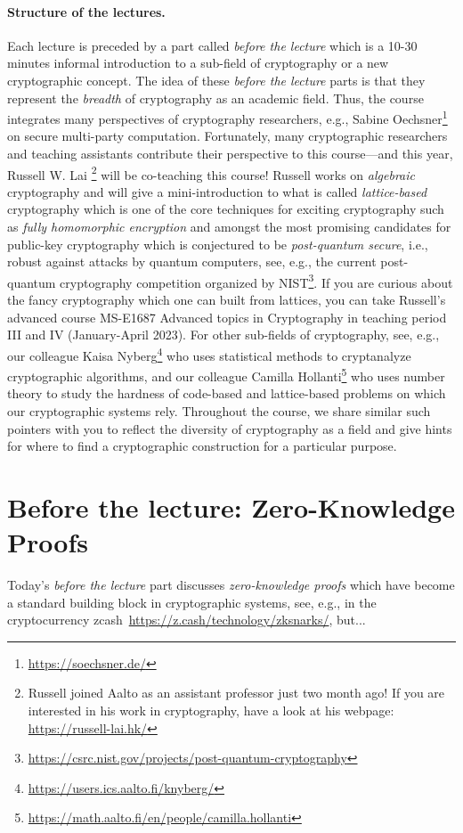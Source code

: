 \documentclass[a4paper,table,dvipsnames]{article}
\theoremstyle{definition}
\begin{document}
\paragraph{Structure of the lectures.} Each lecture is preceded by a part called \emph{before the lecture} which is a 10-30 minutes
informal introduction to a sub-field of cryptography or a new cryptographic concept. The idea
of these \emph{before the lecture} parts is that they represent the \emph{breadth} of cryptography as
an academic field. Thus, the course integrates many perspectives of cryptography researchers, e.g.,
Sabine Oechsner\footnote{\url{https://soechsner.de/}} on secure multi-party computation. Fortunately, 
many cryptographic researchers and teaching assistants contribute
their perspective to this course---and this year, Russell W. Lai \footnote{Russell joined Aalto as an
assistant professor just two month ago! If you are interested in his work in cryptography, have a look at his 
webpage: \url{https://russell-lai.hk/}}
will be co-teaching this course! Russell works on \emph{algebraic} cryptography and will give a mini-introduction to
what is called \emph{lattice-based} cryptography which is one of the core techniques for
exciting cryptography such as \emph{fully homomorphic encryption} and amongst the most promising candidates for public-key cryptography which is conjectured to be \emph{post-quantum secure}, i.e., robust against attacks by quantum computers,
see, e.g., the current post-quantum cryptography competition organized by NIST\footnote{\url{https://csrc.nist.gov/projects/post-quantum-cryptography}}. If you are curious about the fancy cryptography which one can built
from lattices, you can take Russell's advanced course MS-E1687 Advanced topics in Cryptography in
teaching period III and IV (January-April 2023). For other sub-fields of
cryptography, see, e.g., our colleague Kaisa Nyberg\footnote{\url{https://users.ics.aalto.fi/knyberg/}}
who uses statistical methods to cryptanalyze cryptographic algorithms, and our colleague Camilla 
Hollanti\footnote{\url{https://math.aalto.fi/en/people/camilla.hollanti}} who uses number theory to 
study the hardness of code-based and lattice-based problems on which our cryptographic systems rely. %
Throughout the course, we share similar such pointers with you to reflect
the diversity of cryptography as a field and give hints for where to find a cryptographic 
construction for a particular purpose.

\section{Before the lecture: Zero-Knowledge Proofs}
Today's \emph{before the lecture} part discusses 
\emph{zero-knowledge proofs} which have become a standard building block in cryptographic
systems, see, e.g., in the cryptocurrency zcash~\url{https://z.cash/technology/zksnarks/},
but... 
\end{document}
